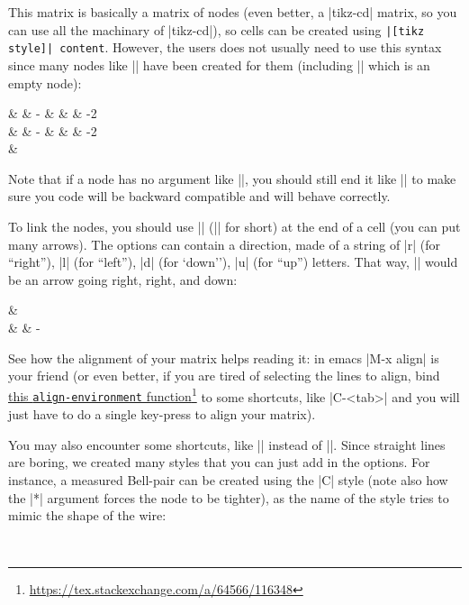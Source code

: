 \documentclass[a4paper,doc2]{ltxdoc} %
\newcommand{\mylink}[2]{\href{#1}{#2}\footnote{\url{#1}}}
\begin{document}
This matrix is basically a \tikzname{} matrix of nodes (even better, a |tikz-cd| matrix, so you can use all the machinary of |tikz-cd|), so cells can be created using \verb#|[tikz style]| content#. However, the users does not usually need to use this syntax since many nodes like || have been created for them (including |\zxN{}| which is an empty node):

\begin{codeexample}[width=0pt]
\begin{ZX}
  \zxZ{} & \zxZ{\alpha} & \zxZ-{\alpha} & \zxZ{\alpha+\beta} &  & \zxFracZ-{\pi}{2}\\
  \zxX{} & \zxX{\alpha} & \zxX-{\alpha} & \zxX{\alpha+\beta} &  & \zxFracX-{\pi}{2}\\
  \zxN{} & \zxH{}
\end{ZX}
\end{codeexample}

Note that if a node has no argument like |\zxN|, you should still end it like |\zxN{}| to make sure you code will be backward compatible and will behave correctly.

To link the nodes, you should use |\arrow[options]| (|\ar[options]| for short) at the end of a cell (you can put many arrows). The options can contain a direction, made of a string of |r| (for ``right''), |l| (for ``left''), |d| (for `down''), |u| (for ``up'') letters. That way, |\ar[rrd]| would be an arrow going right, right, and down:
\begin{codeexample}[]
\begin{ZX}
  \zxZ{} \ar[rrd] & \zxX{}\\
                  &        & \zxX-{\alpha}
\end{ZX}
\end{codeexample}
See how the alignment of your matrix helps reading it: in emacs |M-x align| is your friend (or even better, if you are tired of selecting the lines to align, bind \mylink{https://tex.stackexchange.com/a/64566/116348}{this \texttt{align-environment} function} to some shortcuts, like |C-<tab>| and you will just have to do a single key-press to align your matrix).

You may also encounter some shortcuts, like |\rar| instead of |\ar[r]|. Since straight lines are boring, we created many styles that you can just add in the options. For instance, a measured Bell-pair can be created using the |C| style (note also how the |*| argument forces the node to be tighter), as the name of the style tries to mimic the shape of the wire:
\begin{codeexample}[]
\begin{ZX}
   \ar[d,C]\\
\end{ZX}
\end{codeexample}
\end{document}
